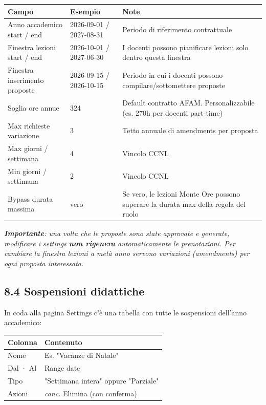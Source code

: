 \documentclass[11pt,a4paper]{article}
\renewenvironment{quote}
  {\begin{list}{}{%
      \setlength{\leftmargin}{8pt}%
      \setlength{\rightmargin}{8pt}%
      \setlength{\topsep}{6pt}%
      \setlength{\parsep}{0pt}}%
      \item\relax\color{black!75}\itshape}
  {\end{list}}
\begin{document}
\begin{table}[H]
\centering
\small
\begin{tabularx}{\linewidth}{|X|X|X|}
\hline
\rowcolor{tableheader} Campo & Esempio & Note \\
\hline
Anno accademico start / end & 2026-09-01 / 2027-08-31 & Periodo di riferimento contrattuale \\
\hline
Finestra lezioni start / end & 2026-10-01 / 2027-06-30 & I docenti possono pianificare lezioni solo dentro questa finestra \\
\hline
Finestra inserimento proposte & 2026-09-15 / 2026-10-15 & Periodo in cui i docenti possono compilare/sottomettere proposte \\
\hline
Soglia ore annue & 324 & Default contratto AFAM. Personalizzabile (es. 270h per docenti part-time) \\
\hline
Max richieste variazione & 3 & Tetto annuale di amendments per proposta \\
\hline
Max giorni / settimana & 4 & Vincolo CCNL \\
\hline
Min giorni / settimana & 2 & Vincolo CCNL \\
\hline
Bypass durata massima & vero & Se vero, le lezioni Monte Ore possono superare la durata max della regola del ruolo \\
\hline
\end{tabularx}
\end{table}


\begin{quote}
\textbf{Importante}: una volta che le proposte sono state approvate e generate, modificare i settings \textbf{non rigenera} automaticamente le prenotazioni. Per cambiare la finestra lezioni a metà anno servono variazioni (amendments) per ogni proposta interessata.
\end{quote}

\subsection{8.4 Sospensioni didattiche}


In coda alla pagina Settings c'è una tabella con tutte le sospensioni dell'anno accademico:

\begin{table}[H]
\centering
\small
\begin{tabularx}{\linewidth}{|X|X|}
\hline
\rowcolor{tableheader} Colonna & Contenuto \\
\hline
Nome & Es. "Vacanze di Natale" \\
\hline
Dal · Al & Range date \\
\hline
Tipo & "Settimana intera" oppure "Parziale" \\
\hline
Azioni & \textit{canc.} Elimina (con conferma) \\
\hline
\end{tabularx}
\end{table}
\end{document}
